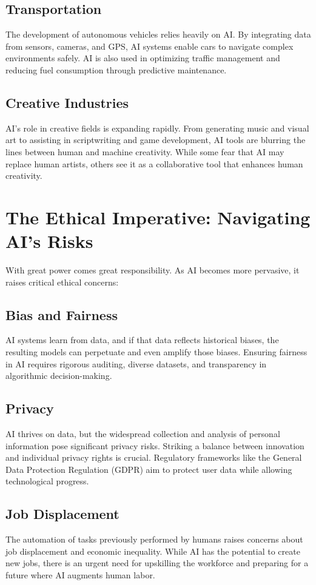 \documentclass{article}
\begin{document}
\subsection{Transportation}
The development of autonomous vehicles relies heavily on AI. By integrating data from sensors, cameras, and GPS, AI systems enable cars to navigate complex environments safely. AI is also used in optimizing traffic management and reducing fuel consumption through predictive maintenance.

\subsection{Creative Industries}
AI's role in creative fields is expanding rapidly. From generating music and visual art to assisting in scriptwriting and game development, AI tools are blurring the lines between human and machine creativity. While some fear that AI may replace human artists, others see it as a collaborative tool that enhances human creativity.

\section{The Ethical Imperative: Navigating AI's Risks}

With great power comes great responsibility. As AI becomes more pervasive, it raises critical ethical concerns:

\subsection{Bias and Fairness}
AI systems learn from data, and if that data reflects historical biases, the resulting models can perpetuate and even amplify those biases. Ensuring fairness in AI requires rigorous auditing, diverse datasets, and transparency in algorithmic decision-making.

\subsection{Privacy}
AI thrives on data, but the widespread collection and analysis of personal information pose significant privacy risks. Striking a balance between innovation and individual privacy rights is crucial. Regulatory frameworks like the General Data Protection Regulation (GDPR) aim to protect user data while allowing technological progress.

\subsection{Job Displacement}
The automation of tasks previously performed by humans raises concerns about job displacement and economic inequality. While AI has the potential to create new jobs, there is an urgent need for upskilling the workforce and preparing for a future where AI augments human labor.
\end{document}
